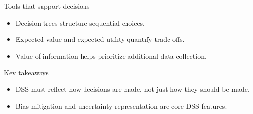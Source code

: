 \documentclass[aspectratio=169,11pt]{beamer}
\begin{document}
\begin{frame}{Tools that support decisions}
  \begin{itemize}
    \item Decision trees structure sequential choices.
    \item Expected value and expected utility quantify trade-offs.
    \item Value of information helps prioritize additional data collection.
  \end{itemize}
\end{frame}


\begin{frame}{Key takeaways}
  \begin{itemize}
    \item DSS must reflect how decisions are made, not just how they should be
    made.
    \item Bias mitigation and uncertainty representation are core DSS features.
  \end{itemize}
\end{frame}
\end{document}
